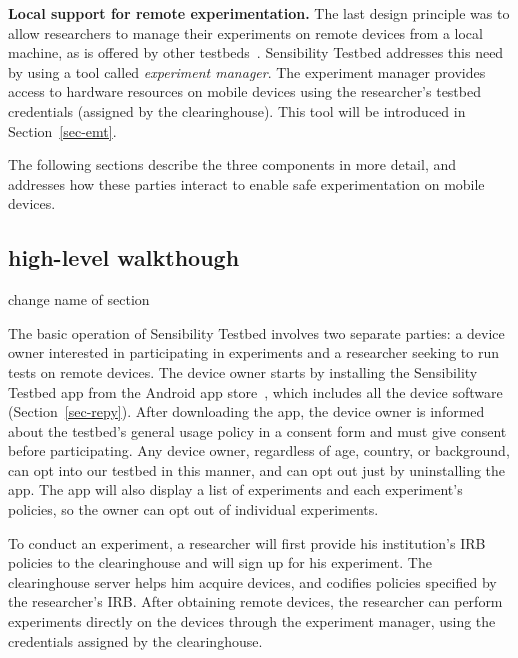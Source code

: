\textbf{Local support for remote experimentation.} 
The last design principle was to allow researchers to manage their 
experiments on remote devices from a local machine, as is offered 
by other testbeds~\cite{hibler2008large, peterson2006experiences}. Sensibility 
Testbed addresses this need by using a tool called \textit{experiment 
manager}. The experiment manager provides access to 
hardware resources on mobile devices using the researcher's testbed 
credentials (assigned by the clearinghouse). This tool will be introduced
in Section~\ref{sec-emt}.

\smallskip
The following sections describe the three components in more detail, and 
addresses how these parties interact to enable safe experimentation on 
mobile devices. 


\subsection{high-level walkthough}
change name of section



The basic operation of Sensibility Testbed involves two separate 
parties: a device owner interested in participating in experiments 
and a researcher seeking to run tests on remote devices. The 
device owner starts by installing the Sensibility Testbed app from 
the Android app store~\cite{sensibility-app}, which includes all the 
device software (Section~\ref{sec-repy}). After downloading the app, 
the device owner is informed about the testbed's general usage policy 
in a consent form and must give consent before participating.
Any device owner, regardless of age, country, or background, can 
opt into our testbed in this manner, and can opt out just by uninstalling 
the app. The app will also display a list of experiments and each 
experiment's policies, so the owner can opt out of individual experiments. 

To conduct an experiment, a researcher will first provide his institution's 
IRB policies to the clearinghouse and will sign up for his experiment.  
The clearinghouse server helps him acquire devices, and codifies 
policies specified by the researcher's IRB. After obtaining remote devices, 
the researcher can perform experiments directly on the devices through 
the experiment manager, using the credentials assigned by the clearinghouse. 




